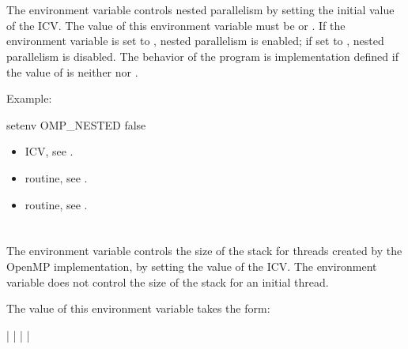 \section{}
\label{sec:OMP_NESTED}
The  environment variable controls nested parallelism by setting the 
initial value of the  ICV. The value of this environment variable must be  
or . If the environment variable is set to , nested parallelism is enabled; if 
set to , nested parallelism is disabled. The behavior of the program is 
implementation defined if the value of  is neither  nor .

Example:
\begin{boxedcode}
setenv OMP\_NESTED false
\end{boxedcode}

\crossreferences
\begin{itemize}
\item {} ICV, see .

\item {} routine, see .

\item {} routine, see .
\end{itemize}











\section{}
\label{sec:OMP_STACKSIZE}
The  environment variable controls the size of the stack for threads 
created by the OpenMP implementation, by setting the value of the  ICV. 
The environment variable does not control the size of the stack for an initial thread. 

The value of this environment variable takes the form: 

 |  |  |  | 

